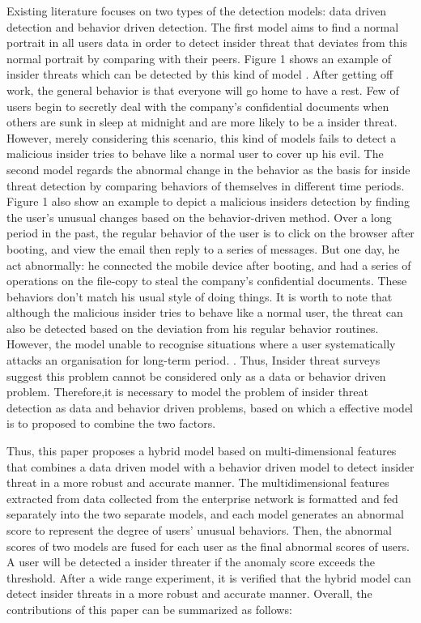 \documentclass[conference]{IEEEtran}
\begin{document}
Existing literature focuses on two types of the detection 
models: data driven detection \cite{b4}\cite{b5} and behavior driven detection\cite{b2}\cite{b6}. 
The first model aims to find a normal portrait in all users data in order to detect insider threat that deviates from  this normal portrait by comparing with their peers. Figure 1 shows an example of insider threats which
can be detected by this kind of model \cite{b10}.
After getting off work, the general behavior is that everyone will go home to have a rest. Few of users begin to secretly deal with the company's confidential documents when others are sunk in sleep at midnight and are more likely to be a insider threat. However, merely considering this scenario,  this kind of models fails to detect a malicious insider tries to behave like a normal user to cover up his evil\cite{b10}.
The second model regards the abnormal change in the behavior as the basis for inside threat detection by comparing behaviors of themselves in different time periods.
Figure 1 also show an example to depict a malicious insiders detection by finding the user's unusual changes based on the behavior-driven method\cite{b8}. Over a long period in the past, the regular behavior of the user is to click on the browser after booting, and view the email then reply to a series of messages. But one day, he act abnormally: he connected the mobile device after booting, and had a series of operations on the file-copy to steal the company's confidential documents. These behaviors don't match his usual style of doing things. It is worth to note that although the malicious insider tries to behave like a normal user, the threat can also be detected based on the deviation from his regular behavior routines.
However, the model unable to recognise situations where a user systematically attacks an
organisation for long-term period. \cite{b2}. Thus,
Insider threat surveys\cite{b9} suggest this problem cannot be considered only as a data or behavior driven problem. Therefore,it is necessary to model the problem of insider threat detection as data and behavior driven problems, based on which a effective model is to proposed to combine the two factors.

Thus, this paper proposes a hybrid model based on multi-dimensional features that combines a data driven model with a behavior driven model to detect insider threat in a more robust and accurate manner.
The multidimensional features extracted from data collected  from the enterprise network is formatted and fed separately into the two separate models, and each model generates an abnormal score to represent the degree of users' unusual behaviors. Then, the abnormal scores of two models are fused for each user as the final abnormal scores of users. A user will be detected a insider threater if the anomaly score exceeds the threshold. After a wide range experiment, it is 
verified that the hybrid model can detect insider threats in a more robust and accurate manner.
Overall, the contributions of this paper can be summarized as follows:
\end{document}
